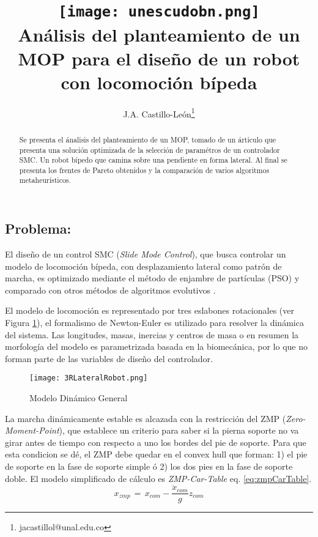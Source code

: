 \documentclass[10pt,onecolumn,twoside,letterpaper]{article}
\title{\vspace{-0.8cm}\texttt{[image: unescudobn.png]}\\\vspace{-0.0cm}
  \LARGE \textbf{An\'alisis del planteamiento de un MOP para el dise\~no de un robot con locomoci\'on b\'ipeda}}
\author{J.A. Castillo-Le\'on\thanks{jacastillol@unal.edu.co}}
\date{}
\begin{document}
\maketitle
\begin{abstract}\small
Se presenta el \'analisis del planteamiento de un MOP, tomado de un \'articulo que presenta una soluci\'on optimizada de la selecci\'on de param\'etros de un controlador SMC. Un robot b\'ipedo que camina sobre una pendiente en forma lateral. Al final se presenta los frentes de Pareto obtenidos y la comparaci\'on de varios algoritmos metaheur\'isticos. 
\end{abstract}
\begin{multicols}{2}
\section{Problema:}
El dise\~no de un control SMC (\emph{Slide Mode Control}), que busca controlar un modelo de locomoci\'on b\'ipeda, con desplazamiento lateral como patr\'on de marcha, es optimizado mediante el m\'etodo de enjambre de part\'iculas (PSO) y comparado con otros m\'etodos de algoritmos evolutivos \cite{Mahmoodabadi2014}.
\par El modelo de locomoci\'on es representado por tres eslabones rotacionales (ver Figura \ref{fig:modelo}), el formalismo de Newton-Euler es utilizado para resolver la din\'amica del sistema. Las longitudes, masas, inercias y centros de masa o en resumen la morfolog\'ia del modelo es parametrizada basada en la biomec\'anica, por lo que no forman parte de las variables de dise\~no del controlador\cite{Mahmoodabadi2014}.
\begin{figure}[H]
  \centering
  \texttt{[image: 3RLateralRobot.png]}
  \caption{Modelo Din\'amico General}
  \label{fig:modelo}
\end{figure}
\par La marcha din\'amicamente estable es alcazada con la restricci\'on del ZMP (\emph{Zero-Moment-Point}), que establece un criterio para saber si la pierna soporte no va girar antes de tiempo con respecto a uno los bordes del pie de soporte. Para que esta condicion se d\'e, el ZMP debe quedar en el convex hull que forman: 1) el pie de soporte en la fase de soporte simple \'o 2) los dos pies en la fase de soporte doble. El modelo simplificado de c\'alculo es \emph{ZMP-Car-Table} eq. \ref{eq:zmpCarTable}.
\begin{equation}
  \label{eq:zmpCarTable}
  x_{zmp}\,=\,x_{com}-\frac{\ddot{x}_{com}}{g}z_{com}
\end{equation}

\end{multicols}
\end{document}
